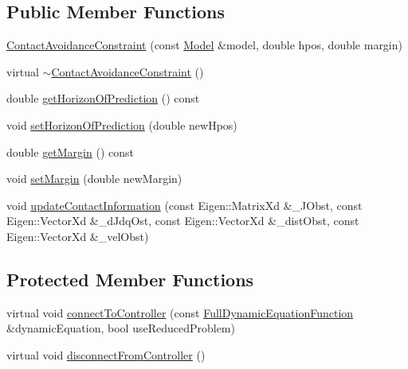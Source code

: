 \subsection*{Public Member Functions}
\begin{DoxyCompactItemize}
\item 
\hyperlink{classocra_1_1ContactAvoidanceConstraint_a77ef6f814bddd8ff8eabb9cf1272b4a3}{Contact\+Avoidance\+Constraint} (const \hyperlink{classocra_1_1Model}{Model} \&model, double hpos, double margin)
\item 
virtual \hyperlink{classocra_1_1ContactAvoidanceConstraint_a57650df61143b936321c20d582f2457f}{$\sim$\+Contact\+Avoidance\+Constraint} ()
\item 
double \hyperlink{classocra_1_1ContactAvoidanceConstraint_a1282e8f163c4b53da93b435cdd16501f}{get\+Horizon\+Of\+Prediction} () const
\item 
void \hyperlink{classocra_1_1ContactAvoidanceConstraint_a667de1446a83d166c7979b6066dd0720}{set\+Horizon\+Of\+Prediction} (double new\+Hpos)
\item 
double \hyperlink{classocra_1_1ContactAvoidanceConstraint_acb8dff3c7d62c30edc180e3526ee8f94}{get\+Margin} () const
\item 
void \hyperlink{classocra_1_1ContactAvoidanceConstraint_a3504dbfab2c8e829bb73960891f4dd01}{set\+Margin} (double new\+Margin)
\item 
void \hyperlink{classocra_1_1ContactAvoidanceConstraint_a3d44cd52a5de9bc2d69da19b29a5d7f7}{update\+Contact\+Information} (const Eigen\+::\+Matrix\+Xd \&\+\_\+\+J\+Obst, const Eigen\+::\+Vector\+Xd \&\+\_\+d\+Jdq\+Ost, const Eigen\+::\+Vector\+Xd \&\+\_\+dist\+Obst, const Eigen\+::\+Vector\+Xd \&\+\_\+vel\+Obst)
\end{DoxyCompactItemize}
\subsection*{Protected Member Functions}
\begin{DoxyCompactItemize}
\item 
virtual void \hyperlink{classocra_1_1ContactAvoidanceConstraint_a9beada2720203ab46265f271309a2ab5}{connect\+To\+Controller} (const \hyperlink{classocra_1_1FullDynamicEquationFunction}{Full\+Dynamic\+Equation\+Function} \&dynamic\+Equation, bool use\+Reduced\+Problem)
\item 
virtual void \hyperlink{classocra_1_1ContactAvoidanceConstraint_a884358568ff7f5510d26ff96915a4d8c}{disconnect\+From\+Controller} ()
\end{DoxyCompactItemize}
